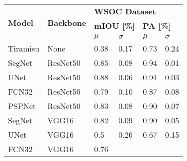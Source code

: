 \documentclass{article}
\begin{document}
\begin{table*}[]
\centering
\begin{tabular}{llllll}
\hline
\multicolumn{1}{|l|}{\multirow{3}{*}{\textbf{Model}}} &
  \multicolumn{1}{l|}{\multirow{3}{*}{\textbf{Backbone}}} &
  \multicolumn{4}{l|}{\textbf{WSOC Dataset}} \\ \cline{3-6} 
\multicolumn{1}{|l|}{} &
  \multicolumn{1}{l|}{} &
  \multicolumn{2}{l|}{\textbf{mIOU {[}\%{]}}} &
  \multicolumn{2}{l|}{\textbf{PA {[}\%{]}}} \\ \cline{3-6} 
\multicolumn{1}{|l|}{} &
  \multicolumn{1}{l|}{} &
  \multicolumn{1}{l|}{$\mu$} &
  \multicolumn{1}{l|}{$\sigma$} &
  \multicolumn{1}{l|}{$\mu$} &
  \multicolumn{1}{l|}{$\sigma$} \\ \hline
\multicolumn{1}{|l|}{Tiramisu \cite{tiramisu}} &
  \multicolumn{1}{l|}{None} &
  \multicolumn{1}{l|}{0.38} &
  \multicolumn{1}{l|}{0.17} &
  \multicolumn{1}{l|}{0.73} &
  \multicolumn{1}{l|}{0.24} \\ \hline
\multicolumn{1}{|l|}{SegNet \cite{segnet}} &
  \multicolumn{1}{l|}{ResNet50} &
  \multicolumn{1}{l|}{0.85} &
  \multicolumn{1}{l|}{0.08} &
  \multicolumn{1}{l|}{0.94} &
  \multicolumn{1}{l|}{0.01} \\ \hline
\multicolumn{1}{|l|}{UNet \cite{unet}} &
  \multicolumn{1}{l|}{ResNet50} &
  \multicolumn{1}{l|}{0.88} &
  \multicolumn{1}{l|}{0.06} &
  \multicolumn{1}{l|}{0.94} &
  \multicolumn{1}{l|}{0.03} \\ \hline
\multicolumn{1}{|l|}{FCN32 \cite{fcn32}} &
  \multicolumn{1}{l|}{ResNet50} &
  \multicolumn{1}{l|}{0.79} &
  \multicolumn{1}{l|}{0.10} &
  \multicolumn{1}{l|}{0.87} &
  \multicolumn{1}{l|}{0.08} \\ \hline
\multicolumn{1}{|l|}{PSPNet \cite{pspnet}} &
  \multicolumn{1}{l|}{ResNet50} &
  \multicolumn{1}{l|}{0.83} &
  \multicolumn{1}{l|}{0.08} &
  \multicolumn{1}{l|}{0.90} &
  \multicolumn{1}{l|}{0.07} \\ \hline
\multicolumn{1}{|l|}{SegNet \cite{segnet}} &
  \multicolumn{1}{l|}{VGG16} &
  \multicolumn{1}{l|}{0.82} &
  \multicolumn{1}{l|}{0.09} &
  \multicolumn{1}{l|}{0.90} &
  \multicolumn{1}{l|}{0.05} \\ \hline
\multicolumn{1}{|l|}{UNet \cite{unet}} &
  \multicolumn{1}{l|}{VGG16} &
  \multicolumn{1}{l|}{0.5} &
  \multicolumn{1}{l|}{0.26} &
  \multicolumn{1}{l|}{0.67} &
  \multicolumn{1}{l|}{0.15} \\ \hline
\multicolumn{1}{|l|}{FCN32 \cite{fcn32}} &
  \multicolumn{1}{l|}{VGG16} &
  \multicolumn{1}{l|}{0.76} &

\end{tabular}
\end{table*}
\end{document}
